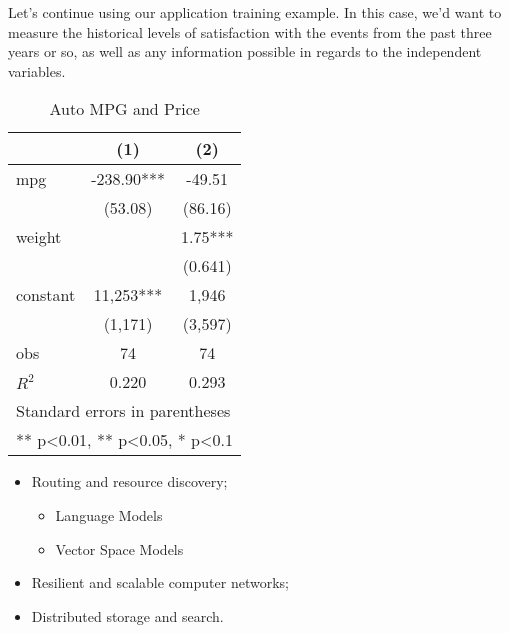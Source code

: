 \documentclass{elegantbook}
\begin{document}
Let's continue using our application training example. In this case, we'd want to measure the historical levels of satisfaction with the events from the past three years or so, as well as any information possible in regards to the independent variables. 


\begin{table}[htbp]
  \small
  \centering
  \caption{Auto MPG and Price \label{tab:reg}}
    \begin{tabular}{lcc}
    \toprule
                    &       (1)         &        (2)      \\
    \midrule
    mpg             &    -238.90***     &      -49.51     \\
                    &     (53.08)       &      (86.16)    \\
    weight          &                   &      1.75***    \\
                    &                   &      (0.641)    \\
    constant        &     11,253***     &       1,946     \\
                    &     (1,171)       &      (3,597)   \\
    obs             &        74         &         74     \\
    $R^2$           &      0.220        &       0.293    \\
    \bottomrule
    \multicolumn{3}{l}{\scriptsize Standard errors in parentheses} \\
    \multicolumn{3}{l}{\scriptsize *** p<0.01, ** p<0.05, * p<0.1} \\
    \end{tabular}%
\end{table}%

\lipsum[1-2]

\begin{itemize}
	\item Routing and resource discovery;
	     \begin{itemize} 
      	   	\item Language Models
       	 	\item Vector Space Models
    		 \end{itemize}
	\item Resilient and scalable computer networks;
	\item Distributed storage and search.
\end{itemize}


\nocite{EINAV2010,Havrylchyk2018} 
\end{document}
